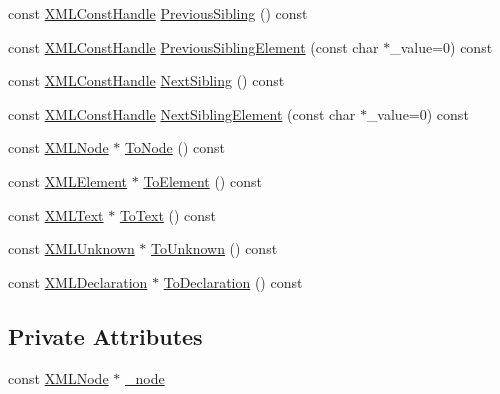 \begin{DoxyCompactItemize}
\item 
const \hyperlink{classtinyxml2_1_1_x_m_l_const_handle}{X\-M\-L\-Const\-Handle} \hyperlink{classtinyxml2_1_1_x_m_l_const_handle_a6917564e26b2c20ebdcb23c7940ad80a}{Previous\-Sibling} () const 
\item 
const \hyperlink{classtinyxml2_1_1_x_m_l_const_handle}{X\-M\-L\-Const\-Handle} \hyperlink{classtinyxml2_1_1_x_m_l_const_handle_acb2e1c5762eff9f6ed72d1a2dfc14271}{Previous\-Sibling\-Element} (const char $\ast$\-\_\-value=0) const 
\item 
const \hyperlink{classtinyxml2_1_1_x_m_l_const_handle}{X\-M\-L\-Const\-Handle} \hyperlink{classtinyxml2_1_1_x_m_l_const_handle_a596e248c8014d718f41658502a2e221b}{Next\-Sibling} () const 
\item 
const \hyperlink{classtinyxml2_1_1_x_m_l_const_handle}{X\-M\-L\-Const\-Handle} \hyperlink{classtinyxml2_1_1_x_m_l_const_handle_a3bbdd3d866c750473bd69a232704503b}{Next\-Sibling\-Element} (const char $\ast$\-\_\-value=0) const 
\item 
const \hyperlink{classtinyxml2_1_1_x_m_l_node}{X\-M\-L\-Node} $\ast$ \hyperlink{classtinyxml2_1_1_x_m_l_const_handle_a95d0256318c10c3f75fa5f8ffb3e4bc1}{To\-Node} () const 
\item 
const \hyperlink{classtinyxml2_1_1_x_m_l_element}{X\-M\-L\-Element} $\ast$ \hyperlink{classtinyxml2_1_1_x_m_l_const_handle_a5a48adefc2a5e70d4ce5b55692a0e2f9}{To\-Element} () const 
\item 
const \hyperlink{classtinyxml2_1_1_x_m_l_text}{X\-M\-L\-Text} $\ast$ \hyperlink{classtinyxml2_1_1_x_m_l_const_handle_ad86ca7dbb20d0495ae357fe7a866e0be}{To\-Text} () const 
\item 
const \hyperlink{classtinyxml2_1_1_x_m_l_unknown}{X\-M\-L\-Unknown} $\ast$ \hyperlink{classtinyxml2_1_1_x_m_l_const_handle_acb358a329e54fa204ed2d0b181566828}{To\-Unknown} () const 
\item 
const \hyperlink{classtinyxml2_1_1_x_m_l_declaration}{X\-M\-L\-Declaration} $\ast$ \hyperlink{classtinyxml2_1_1_x_m_l_const_handle_a5de0c175845bc30a6f9b3d88d8877eaf}{To\-Declaration} () const 
\end{DoxyCompactItemize}
\subsection*{Private Attributes}
\begin{DoxyCompactItemize}
\item 
const \hyperlink{classtinyxml2_1_1_x_m_l_node}{X\-M\-L\-Node} $\ast$ \hyperlink{classtinyxml2_1_1_x_m_l_const_handle_ad4d8db839660ef730adfa2439945c4da}{\-\_\-node}
\end{DoxyCompactItemize}


